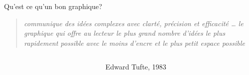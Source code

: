 \documentclass[
  ignorenonframetext,
]{beamer}
\begin{document}
\begin{frame}{Qu'est ce qu'un bon graphique?}
\protect\hypertarget{quest-ce-quun-bon-graphique}{}
\begin{quote}
\emph{communique des idées complexes avec clarté, précision et
efficacité \ldots{} le graphique qui offre au lecteur le plus grand
nombre d'idées le plus rapidement possible avec le moins d'encre et le
plus petit espace possible}
\end{quote}

\begin{columns}[T]
\begin{column}{0.7\textwidth}
\end{column}

\begin{column}{0.3\textwidth}
Edward Tufte, 1983
\end{column}
\end{columns}
\end{frame}
\end{document}
